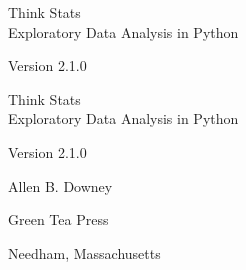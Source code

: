 \documentclass[12pt]{book}
\newcommand{\thetitle}{Think Stats}
\newcommand{\thesubtitle}{Exploratory Data Analysis in Python}
\newcommand{\theversion}{2.1.0}
\begin{document}
\begin{latexonly}

\renewcommand{\blankpage}{\thispagestyle{empty} \quad \newpage}



\thispagestyle{empty}

\begin{flushright}
\vspace*{2.0in}

\begin{spacing}{3}
{\huge \thetitle}\\
{\Large \thesubtitle }
\end{spacing}

\vspace{0.25in}

Version \theversion

\vfill

\end{flushright}


\blankpage
\blankpage

\pagebreak
\thispagestyle{empty}

\begin{flushright}
\vspace*{2.0in}

\begin{spacing}{3}
{\huge \thetitle}\\
{\Large \thesubtitle}
\end{spacing}

\vspace{0.25in}

Version \theversion

\vspace{1in}


{\Large
Allen B. Downey\\
}


\vspace{0.5in}

{\Large Green Tea Press}

{\small Needham, Massachusetts}

\vfill


\end{flushright}
\end{latexonly}
\end{document}

